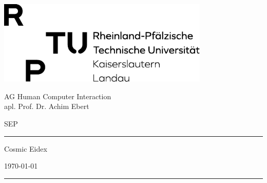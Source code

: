 \thispagestyle{empty}
	\newcommand{\Rule}{\rule{\textwidth}{0.5mm}}
	\begin{center}
	{\Large \includegraphics[height=40mm]{img/RPTU_LOGO_SCHWARZ} \par}

	\vspace{3em}

	{\Large AG Human Computer Interaction \\ apl. Prof. Dr. Achim Ebert \par}

	\vspace{0.5em}

	{\Large SEP \the\year \par}


	\vspace{2cm}

	\Rule

	\vspace{1cm}

	{\Huge Cosmic Eidex \par}

	\vspace{0.5em}

	{\Large \mysubject \par}

	\vspace{0.5em}

	{\small \today \par}

	\vspace{0.7cm}

	\Rule


	\vfill %


	\emph{\textbf{\mygroup}} \\[1em]
	\myauthor

	\end{center}
